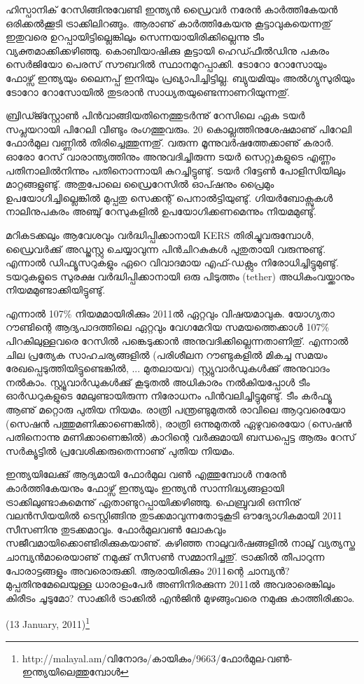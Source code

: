 ഹിസ്പാനിക് റേസിങ്ങിനുവേണ്ടി ഇന്ത്യന്‍ ഡ്രൈവര്‍ നരേന്‍ കാര്‍ത്തികേയന്‍ ഒരിക്കല്‍ക്കൂടി ട്രാക്കിലിറങ്ങും. ആരാണു് 
കാര്‍ത്തികേയനു കൂട്ടാവുകയെന്നതു് ഇതുവരെ ഉറപ്പായിട്ടില്ലെങ്കിലും സെന്നയായിരിക്കില്ലെന്നു ടീം വ്യക്തമാക്കിക്കഴിഞ്ഞു. 
കൊബിയാഷിക്കു കൂട്ടായി ഹെഡ്ഫീല്‍ഡിനു പകരം സെര്‍ജിയോ പെരസ് സൗബറില്‍ സ്ഥാനമുറപ്പാക്കി. ടോറോ
 റോസോയും ഫോഴ്സ് ഇന്ത്യയും ലൈനപ്പ് ഇനിയും പ്രഖ്യാപിച്ചിട്ടില്ല. ബ്യുയമിയും അല്‍ഗ്യുസുരിയും ടോറോ റോസോയില്‍ 
തുടരാന്‍ സാധ്യതയുണ്ടെന്നാണറിയുന്നതു്.

ബ്രിഡ്ജ്സ്റ്റോണ്‍ പിന്‍വാങ്ങിയതിനെത്തുടര്‍ന്നു് റേസിലെ ഏക ടയര്‍ സപ്ലയറായി പിറേലി വീണ്ടും രംഗത്തുവരും. 20 
കൊല്ലത്തിനുശേഷമാണു് പിറേലി ഫോര്‍മുല വണ്ണില്‍ തിരിച്ചെത്തുന്നതു്. വരുന്ന മൂന്നുവര്‍ഷത്തേക്കാണു് കരാര്‍. ഓരോ
റേസ് വാരാന്ത്യത്തിനും അനുവദിച്ചിരുന്ന ടയര്‍ സെറ്റുകളുടെ എണ്ണം പതിനാലില്‍നിന്നും പതിനൊന്നായി കുറച്ചിട്ടുണ്ടു്. 
ടയര്‍ റിട്ടേണ്‍ പോളിസിയിലും മാറ്റങ്ങളുണ്ടു്. അതുപോലെ ഡ്രൈറേസില്‍ ഓപ്ഷനും പ്രൈമും 
ഉപയോഗിച്ചില്ലെങ്കില്‍ മുപ്പതു സെക്കന്റ് പെനാല്‍ട്ടിയുണ്ടു്. ഗിയര്‍ബോക്സുകള്‍ നാലിനുപകരം അഞ്ചു് റേസുകളില്‍ 
ഉപയോഗിക്കണമെന്നും നിയമമുണ്ടു്.

മറികടക്കലും ആവേശവും വര്‍ദ്ധിപ്പിക്കാനായി KERS തിരിച്ചുവരുമ്പോള്‍, ഡ്രൈവര്‍ക്കു് അഡ്ജസ്റ്റു ചെയ്യാവുന്ന 
പിന്‍ചിറകുകള്‍ പുതുതായി വരുന്നുണ്ടു്. എന്നാല്‍ ഡിഫ്യൂസറുകളും ഏറെ വിവാദമായ എഫ്-ഡക്റ്റും നിരോധിച്ചിട്ടുമുണ്ടു്. 
ടയറുകളുടെ സുരക്ഷ വര്‍ദ്ധിപ്പിക്കാനായി ഒരു പിടുത്തം (tether) അധികംവയ്ക്കാനും നിയമമുണ്ടാക്കിയിട്ടുണ്ടു്.

എന്നാല്‍ 107\% നിയമമായിരിക്കും 2011ല്‍ ഏറ്റവും വിഷയമാവുക. യോഗ്യതാ റൗണ്ടിന്റെ ആദ്യപാദത്തിലെ 
ഏറ്റവും വേഗമേറിയ സമയത്തെക്കാള്‍ 107\% പിറകിലുള്ളവരെ റേസില്‍ പങ്കെടുക്കാന്‍ അനുവദിക്കില്ലെന്നതാണിതു്. 
എന്നാല്‍ ചില പ്രത്യേക സാഹചര്യങ്ങളില്‍ (പരിശീലന റൗണ്ടുകളില്‍ മികച്ച സമയം രേഖപ്പെടുത്തിയിട്ടുണ്ടെങ്കില്‍, ... മുതലായവ) 
സ്റ്റ്യുവാര്‍ഡുകള്‍ക്കു് അനുവാദം നല്‍കാം. സ്റ്റ്യൂവാര്‍ഡുകള്‍ക്കു് കൂടുതല്‍ അധികാരം നല്‍കിയപ്പോള്‍ ടീം ഓര്‍ഡറുകളുടെ 
മേലുണ്ടായിരുന്ന നിരോധനം പിന്‍വലിച്ചിട്ടുമുണ്ടു്. ടീം കര്‍ഫ്യൂ ആണു് മറ്റൊരു പുതിയ നിയമം. രാത്രി പന്ത്രണ്ടുമുതല്‍ 
രാവിലെ ആറുവരെയോ (സെഷന്‍ പത്തുമണിക്കാണെങ്കില്‍), രാത്രി ഒന്നുമുതല്‍ ഏഴുവരെയോ (സെഷന്‍ പതിനൊന്നു 
മണിക്കാണെങ്കില്‍) കാറിന്റെ വര്‍ക്കുമായി ബന്ധപ്പെട്ട ആരും റേസ് സര്‍ക്യൂട്ടില്‍ പ്രവേശിക്കരുതെന്നാണു് പുതിയ നിയമം.

ഇന്ത്യയിലേക്കു് ആദ്യമായി ഫോര്‍മുല വണ്‍ എത്തുമ്പോള്‍ നരേന്‍ കാര്‍ത്തികേയനും ഫോഴ്സ് ഇന്ത്യയും ഇന്ത്യന്‍ 
സാന്നിദ്ധ്യങ്ങളായി ട്രാക്കിലുണ്ടാകുമെന്നു് ഏതാണ്ടുറപ്പായിക്കഴിഞ്ഞു. ഫെബ്രുവരി ഒന്നിനു് വലന്‍സിയയില്‍ ടെസ്റ്റിങ്ങിനു 
തുടക്കമാവുന്നതോടുകൂടി ഔദ്യോഗികമായി 2011 സീസണിനു തുടക്കമാവും. ഫോര്‍മുലവണ്‍ ലോകവും 
സജീവമായിക്കൊണ്ടിരിക്കുകയാണു്. കഴിഞ്ഞ നാലുവര്‍ഷങ്ങളില്‍ നാലു് വ്യത്യസ്ത ചാമ്പ്യന്‍മാരെയാണു് നമുക്കു് 
സീസണ്‍ സമ്മാനിച്ചതു്. ട്രാക്കില്‍ തീപാറുന്ന പോരാട്ടങ്ങളും അവരൊരുക്കി. ആരായിരിക്കും 2011ന്റെ ചാമ്പ്യന്‍? 
മുപ്പതിനുമേലെയുള്ള ധാരാളംപേര്‍ അണിനിരക്കുന്ന 2011ല്‍ അവരാരെങ്കിലും കിരീടം ചൂടുമോ? സാക്കിര്‍ ട്രാക്കില്‍ 
എന്‍ജിന്‍ മുഴങ്ങുംവരെ നമുക്കു കാത്തിരിക്കാം.

\begin{flushright}(13 January, 2011)\footnote{http://malayal.am/വിനോദം/കായികം/9663/ഫോര്‍മുല-വണ്‍-ഇന്ത്യയിലെത്തുമ്പോള്‍}\end{flushright}

\newpage
